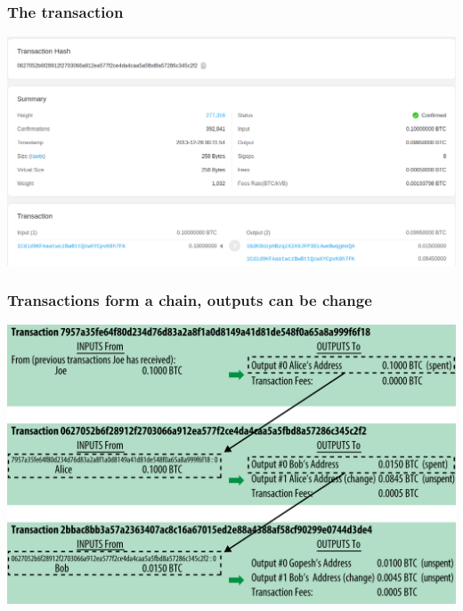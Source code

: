 \documentclass[11pt]{beamer}  %
\begin{document}
\begin{frame}\frametitle{The transaction}

  \begin{center}
    \includegraphics[scale=0.21,clip=false]{pictures/bitcoin-spend.png}
  \end{center}

\end{frame}

\begin{frame}\frametitle{Transactions form a chain, outputs can be change}

  \begin{center}
    \includegraphics[scale=0.23,clip=false]{pictures/mbc2_0204.png}
  \end{center}

\end{frame}
\end{document}
